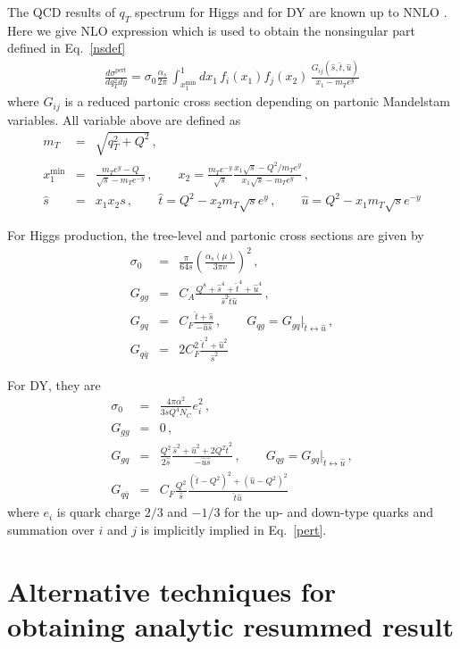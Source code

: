 \documentclass[a4,letterpaper,11pt]{article}
\newcommand{\nn}{\nonumber}
\newcommand{\bea}{\begin{eqnarray}}
\newcommand{\eea}{\end{eqnarray}}
\newcommand{\as}{\alpha_s}
\newcommand{\hats}{\hat{s}}
\newcommand{\hatt}{\hat{t}}
\newcommand{\hatu}{\hat{u}}
\newcommand{\eq}[1]{Eq.~\eqref{#1}}
\begin{document}
The QCD results of $q_T$ spectrum for Higgs and for DY are known up to NNLO \cite{deFlorian:1999zd,Glosser:2002gm,Ravindran:2002dc,Ellis:1981nt,Ellis:1981hk,Arnold:1988dp,Gonsalves:1989ar,Catani:2009sm}.
Here we give NLO expression \cite{Kajantie:1978qv,Altarelli:1977kt,Halzen:1978et,Glosser:2002gm} which is used to obtain the nonsingular part defined in \eq{nsdef}
\bea \label{pert}
\frac{d\sigma^\text{pert}}{dq_T^2 dy} = \sigma_0 \frac{\as}{2\pi}\,
\int_{x_1^\text{min}}^1 dx_1\, f_i(x_1) f_j(x_2)\, \frac{ G_{ij}(\hats, \hatt, \hatu)}{x_1-m_T e^y}
\eea
where $G_{ij}$ is a reduced partonic cross section depending on partonic Mandelstam variables.
All variable above are defined as
\bea
m_T&=&\sqrt{q_T^2+Q^2} \nn \,,\\
x_1^\text{min}&=&\frac{ m_T e^y-Q} {\sqrt{s}-m_T e^{-y}}  \,, \qquad
x_2=\frac{m_T e^{-y}}{\sqrt{s}}\frac{ x_1\sqrt{s}-Q^2/m_T e^y}{x_1 \sqrt{s}-m_T  e^y}
\nn\,,\\
\hats &=& x_1 x_2 s  \,, \qquad
\hatt =Q^2-x_2 m_T\sqrt{s} e^y \, , \qquad
\hatu =Q^2-x_1 m_T \sqrt{s} e^{-y}
\eea


For Higgs production, the tree-level and partonic cross sections are given by
\bea
\sigma_0&=&\frac{\pi}{64 s}\left( \frac{\as(\mu)}{3\pi v}\right)^2
\,,\nn\\
G_{gg} &=& C_A \frac{Q^8+\hats^4+\hatt^4+\hatu^4}{ \hats^2 \hatt \hatu}
\,,\nn\\
G_{gq} &=&C_F \frac{\hatt+\hats}{-\hatu \hats}\,, \qquad G_{qg}=G_{gq}|_{\hatt \leftrightarrow \hatu}
\,,\nn\\
G_{q\bar q} &=& 2C_F^2 \frac{\hatt^2+\hatu^2}{\hats^2}
\eea

For DY, they are
\bea
\sigma_0&=&\frac{4\pi\alpha^2}{3sQ^4 N_C}e_i^2
\,,\nn\\
G_{gg} &=& 0
\,,\nn\\
G_{gq} &=&\frac{Q^2}{2\hats} \frac{\hats^2+\hatu^2+2Q^2\hatt^2}{-\hatu \hats}\,, \qquad G_{qg}=G_{gq}|_{\hatt \leftrightarrow \hatu}
\,,\nn\\
G_{q\bar q} &=& C_F \frac{Q^2}{\hats} \frac{ (\hatt-Q^2)^2+(\hatu-Q^2)^2  }{\hatt \hatu}
\eea
where $e_i$ is quark charge $2/3$ and $-1/3 $ for the up- and  down-type quarks and summation over $i$ and $j$ is implicitly implied in \eq{pert}.


\section{Alternative techniques for obtaining analytic resummed result}
\label{app:alternatives}
\end{document}
